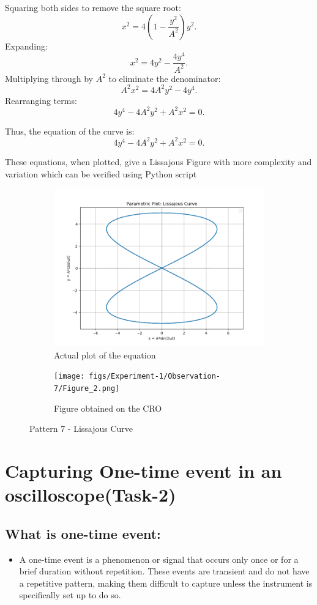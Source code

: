 \documentclass[12pt]{article}
\begin{document}
Squaring both sides to remove the square root:
\[
x^2 = 4 \left( 1 - \frac{y^2}{A^2} \right) y^2.
\]
Expanding:
\[
x^2 = 4y^2 - \frac{4y^4}{A^2}.
\]
Multiplying through by \( A^2 \) to eliminate the denominator:
\[
A^2 x^2 = 4A^2 y^2 - 4y^4.
\]
Rearranging terms:
\[
4y^4 - 4A^2 y^2 + A^2 x^2 = 0.
\]

Thus, the equation of the curve is:
\[
4y^4 - 4A^2 y^2 + A^2 x^2 = 0.
\]

These equations, when plotted, give a Lissajous Figure with more complexity and variation which can be verified using Python script
\begin{figure}[htbp]
    \centering
    \begin{subfigure}[b]{0.45\textwidth}
        \centering
        \includegraphics[width=\textwidth]{figs/Experiment-1/Observation-7/Figure_1.jpg}
        \caption{Actual plot of the equation}
    \end{subfigure}
    \hfill
    \begin{subfigure}[b]{0.45\textwidth}
        \centering
        \texttt{[image: figs/Experiment-1/Observation-7/Figure\_2.png]}
        \caption{Figure obtained on the CRO}
    \end{subfigure}
    \caption{Pattern 7 - Lissajous Curve}
\end{figure}


\section{Capturing One-time event in an oscilloscope(Task-2)}
\subsection{What is one-time event:}
\begin{itemize}
\item A one-time event is a phenomenon or signal that occurs only once or for a brief duration without repetition. These events are transient and do not have a repetitive pattern, making them difficult to capture unless the instrument is specifically set up to do so.\\
\end{itemize}
\end{document}
